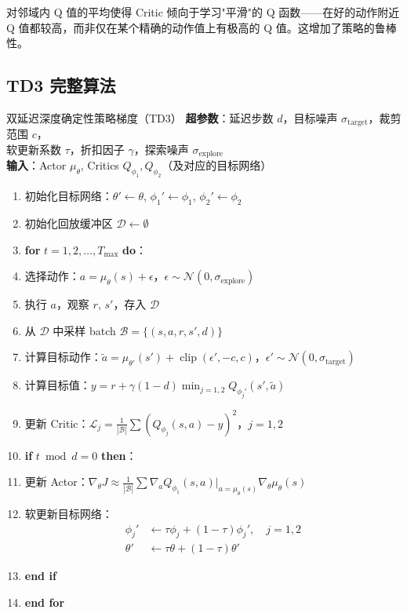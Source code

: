 对邻域内 Q 值的平均使得 Critic 倾向于学习"平滑"的 Q 函数——在好的动作附近 Q 值都较高，而非仅在某个精确的动作值上有极高的 Q 值。这增加了策略的鲁棒性。

\subsection{TD3 完整算法}

\begin{myalgorithm}{双延迟深度确定性策略梯度（TD3）}
\textbf{超参数}：延迟步数 $d$，目标噪声 $\sigma_{\text{target}}$，裁剪范围 $c$，\\
\qquad\qquad 软更新系数 $\tau$，折扣因子 $\gamma$，探索噪声 $\sigma_{\text{explore}}$\\
\textbf{输入}：Actor $\mu_\theta$, Critics $Q_{\phi_1}, Q_{\phi_2}$（及对应的目标网络）
\begin{enumerate}
    \item 初始化目标网络：$\theta' \leftarrow \theta$, $\phi_1' \leftarrow \phi_1$, $\phi_2' \leftarrow \phi_2$
    \item 初始化回放缓冲区 $\mathcal{D} \leftarrow \emptyset$
    \item \textbf{for} $t = 1, 2, \dots, T_{\max}$ \textbf{do}：
    \item \quad 选择动作：$a = \mu_\theta(s) + \epsilon$，$\epsilon \sim \mathcal{N}(0, \sigma_{\text{explore}})$
    \item \quad 执行 $a$，观察 $r$, $s'$，存入 $\mathcal{D}$
    \item \quad 从 $\mathcal{D}$ 中采样 batch $\mathcal{B} = \{(s, a, r, s', d)\}$
    \item \quad 计算目标动作：$\tilde{a} = \mu_{\theta'}(s') + \operatorname{clip}(\epsilon', -c, c)$，$\epsilon' \sim \mathcal{N}(0, \sigma_{\text{target}})$
    \item \quad 计算目标值：$y = r + \gamma(1-d) \min_{j=1,2} Q_{\phi_j'}(s', \tilde{a})$
    \item \quad 更新 Critic：$\mathcal{L}_j = \frac{1}{|\mathcal{B}|} \sum (Q_{\phi_j}(s, a) - y)^2$，$j=1,2$
    \item \quad \textbf{if} $t \bmod d = 0$ \textbf{then}：
    \item \quad \quad 更新 Actor：$\nabla_\theta J \approx \frac{1}{|\mathcal{B}|} \sum \nabla_a Q_{\phi_1}(s, a)|_{a=\mu_\theta(s)} \nabla_\theta \mu_\theta(s)$
    \item \quad \quad 软更新目标网络：
    \begin{align*}
        \phi_j' &\leftarrow \tau \phi_j + (1-\tau) \phi_j', \quad j=1,2 \\
        \theta' &\leftarrow \tau \theta + (1-\tau) \theta'
    \end{align*}
    \item \quad \textbf{end if}
    \item \textbf{end for}
\end{enumerate}
\end{myalgorithm}


